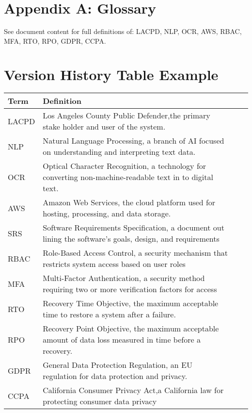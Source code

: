 \documentclass[12pt]{article}
\begin{document}
\section{Appendix A: Glossary}
See document content for full definitions of: LACPD, NLP, OCR, AWS, RBAC, MFA, RTO, RPO, GDPR, CCPA.

\section*{Version History Table Example}
\begin{longtable}{|l|l|p{8cm}|l|}
\hline
\textbf{Term} & \textbf{Definition} \\
\hline
LACPD & Los Angeles County Public Defender,the primary stake holder and user of the system.  \\
NLP & Natural Language Processing, a branch of AI focused on understanding and interpreting text data. \\
OCR & Optical Character Recognition, a technology for converting
 non-machine-readable text in to digital text. \\
AWS & Amazon Web Services, the cloud platform used for hosting, processing, and data storage. \\
SRS &  Software Requirements Specification, a document out lining the software's goals, design, and requirements  \\
RBAC & Role-Based Access Control, a security mechanism that restricts system
 access based on user roles \\
MFA & Multi-Factor Authentication, a security method requiring two or more
 verification factors for access \\
RTO & Recovery Time Objective, the maximum acceptable time to restore a
 system after a failure. \\
RPO &  Recovery Point Objective, the maximum acceptable amount of data loss
 measured in time before a recovery. \\
GDPR & General Data Protection Regulation, an EU regulation for data protection  and privacy. \\
CCPA & California Consumer Privacy Act,a California law for protecting consumer data privacy\\

\hline
\end{longtable}
\end{document}

